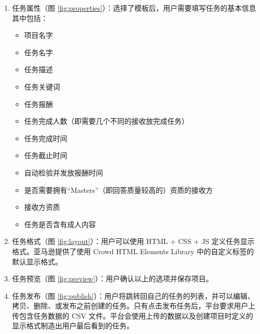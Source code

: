 \begin{enumerate}
    \item 任务属性（图 \ref{fig:properties}）：选择了模板后，用户需要填写任务的基本信息其中包括：
    \begin{multicols}{2}
        \begin{itemize}
            \item 项目名字
            \item 任务名字
            \item 任务描述
            \item 任务关键词
            \item 任务报酬
            \item 任务完成人数（即需要几个不同的接收放完成任务）
            \item 任务完成时间
            \item 任务截止时间
            \item 自动检验并发放报酬时间
            \item 是否需要拥有“Masters”（即回答质量较高的）资质的接收方
            \item 接收方资质
            \item 任务是否含有成人内容
        \end{itemize}
    \end{multicols}
    \item 任务格式（图 \ref{fig:layout}）：用户可以使用 HTML + CSS + JS 定义任务显示格式。亚马逊提供了使用 Crowd HTML Elements Library 中的自定义标签的默认显示格式。
    \item 任务预览（图 \ref{fig:preview}）：用户确认以上的选项并保存项目。
    \item 任务发布（图 \ref{fig:publish}）：用户将跳转回自己的任务的列表，并可以编辑、拷贝、删除、或发布之前创建的任务。只有点击发布任务后，平台要求用户上传包含任务数据的 CSV 文件。平台会使用上传的数据以及创建项目时定义的显示格式制造出用户最后看到的任务。
\end{enumerate}